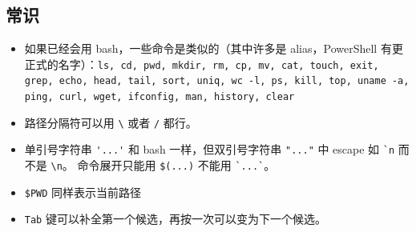 
\subsection{常识}
\begin{itemize}
\item 如果已经会用 bash，一些命令是类似的（其中许多是 alias，PowerShell 有更正式的名字）：\verb`ls, cd, pwd, mkdir, rm, cp, mv, cat, touch, exit, grep, echo, head, tail, sort, uniq, wc -l, ps, kill, top, uname -a, ping, curl, wget, ifconfig, man, history, clear`
\item 路径分隔符可以用 \verb`\` 或者 \verb`/` 都行。
\item 单引号字符串 \verb`'...'` 和 bash 一样，但双引号字符串 \verb`"..."` 中 escape 如 \verb|`n| 而不是 \verb`\n`。 命令展开只能用 \verb`$(...)` 不能用 \verb|`...`|。
\item \verb`$PWD` 同样表示当前路径
\item \verb`Tab` 键可以补全第一个候选，再按一次可以变为下一个候选。
\end{itemize}

